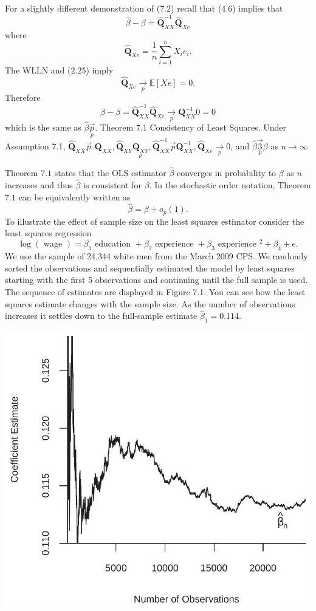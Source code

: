 \documentclass[10pt]{article}
\begin{document}
For a slightly different demonstration of (7.2) recall that (4.6) implies that
$$
\widehat{\beta}-\beta=\widehat{\boldsymbol{Q}}_{X X}^{-1} \widehat{\boldsymbol{Q}}_{X e}
$$
where
$$
\widehat{\boldsymbol{Q}}_{X e}=\frac{1}{n} \sum_{i=1}^{n} X_{i} e_{i} .
$$
The WLLN and (2.25) imply
$$
\widehat{\boldsymbol{Q}}_{X e} \underset{p}{\longrightarrow} \mathbb{E}[X e]=0 .
$$
Therefore
$$
\widehat{\beta}-\beta=\widehat{\boldsymbol{Q}}_{X X}^{-1} \widehat{\boldsymbol{Q}}_{X e} \underset{p}{\longrightarrow} \boldsymbol{Q}_{X X}^{-1} 0=0
$$
which is the same as $\widehat{\beta} \underset{p}{\vec{p}}$. Theorem 7.1 Consistency of Least Squares. Under Assumption 7.1, $\widehat{\boldsymbol{Q}}_{X X} \vec{p}$ $\boldsymbol{Q}_{X X}, \widehat{\boldsymbol{Q}}_{X Y} \underset{p}{\boldsymbol{Q}_{X Y}}, \widehat{\boldsymbol{Q}}_{X X}^{-1} \vec{p} \boldsymbol{Q}_{X X}^{-1}, \widehat{\boldsymbol{Q}}_{X e} \underset{p}{\rightarrow} 0$, and $\widehat{\beta} \underset{p}{\overrightarrow{3}} \beta$ as $n \rightarrow \infty$

Theorem $7.1$ states that the OLS estimator $\widehat{\beta}$ converges in probability to $\beta$ as $n$ increases and thus $\widehat{\beta}$ is consistent for $\beta$. In the stochastic order notation, Theorem $7.1$ can be equivalently written as
$$
\widehat{\beta}=\beta+o_{p}(1) .
$$
To illustrate the effect of sample size on the least squares estimator consider the least squares regression
$$
\log (\text { wage })=\beta_{1} \text { education }+\beta_{2} \text { experience }+\beta_{3} \text { experience }^{2}+\beta_{4}+e .
$$
We use the sample of 24,344 white men from the March 2009 CPS. We randomly sorted the observations and sequentially estimated the model by least squares starting with the first 5 observations and continuing until the full sample is used. The sequence of estimates are displayed in Figure 7.1. You can see how the least squares estimate changes with the sample size. As the number of observations increases it settles down to the full-sample estimate $\widehat{\beta}_{1}=0.114$.

\includegraphics[max width=\textwidth]{2022_09_17_4fdd33cd9a12f3020189g-03}
\end{document}

